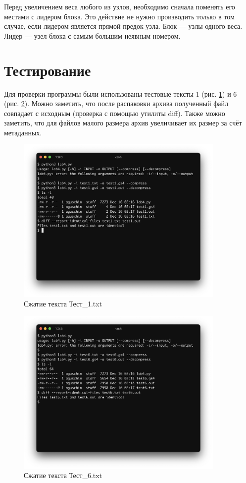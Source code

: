 \documentclass[a4paper,oneside]{article}
\theoremstyle{definition}
\begin{document}
Перед увеличением веса любого из узлов, необходимо сначала поменять его местами
с лидером блока. Это действие не нужно производить только в том случае, если
лидером является прямой предок узла. Блок --- узлы одного веса. Лидер --- узел
блока с самым большим неявным номером.


\section{Тестирование}

Для проверки программы были использованы тестовые тексты 1 (рис.
\ref{fig:test_1}) и 6 (рис. \ref{fig:test_6}). Можно заметить,
что после распаковки архива полученный файл совпадает с исходным (проверка
с помощью утилиты diff). Также можно заметить, что для файлов малого размера
архив увеличивает их размер за счёт метаданных.

\begin{figure}[H]
  \centering
  \includegraphics[width=0.9\textwidth]{test1.png}
  \caption{Сжатие текста Тест\_1.txt}
  \label{fig:test_1}
\end{figure}

\begin{figure}[H]
  \centering
  \includegraphics[width=0.9\textwidth]{test6.png}
  \caption{Сжатие текста Тест\_6.txt}
  \label{fig:test_6}
\end{figure}
\end{document}
